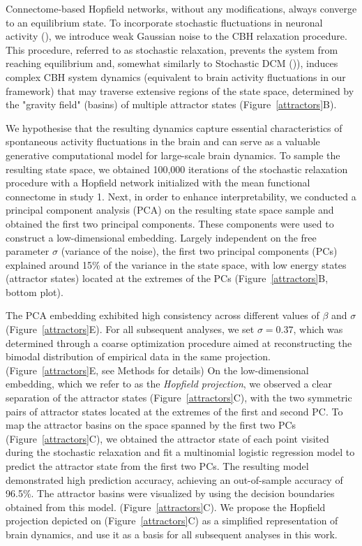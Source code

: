 \documentclass{article}
\begin{document}
Connectome-based Hopfield networks, without any modifications, always converge to an equilibrium state.
To incorporate stochastic fluctuations in neuronal activity (\href{https://doi.org/10.1098/rstb.2005.1638}{}), we introduce weak Gaussian noise to the CBH relaxation procedure. This procedure, referred to as stochastic relaxation, prevents the system from reaching equilibrium and, somewhat similarly to Stochastic DCM (\href{https://doi.org/10.1016/j.neuroimage.2012.04.061}{})), induces complex CBH system dynamics  (equivalent to brain activity fluctuations in our framework) that may traverse extensive regions of the state space, determined by the "gravity field" (basins) of multiple attractor states (Figure~\ref{attractors}B).

We hypothesise that the resulting dynamics capture essential characteristics of spontaneous activity fluctuations in the brain and can serve as a valuable generative computational model for large-scale brain dynamics.
To sample the resulting state space, we obtained 100,000 iterations of the stochastic relaxation procedure with a Hopfield network initialized with the mean functional connectome in study 1.
Next, in order to enhance interpretability, we conducted a principal component analysis (PCA) on the resulting state space sample and obtained the first two principal components. These components were used to construct a low-dimensional embedding.
Largely independent on the free parameter $\sigma$ (variance of the noise), the first two principal components (PCs) explained around 15\% of the variance in the state space, with low energy states (attractor states) located at the extremes of the PCs (Figure~\ref{attractors}B, bottom plot).

The PCA embedding exhibited high consistency across different values of $\beta$ and $\sigma$ (Figure~\ref{attractors}E).
For all subsequent analyses, we set $\sigma=0.37$, which was determined through a coarse optimization procedure aimed at reconstructing the bimodal distribution of empirical data in the same projection. (Figure~\ref{attractors}E, see Methods for details)
On the low-dimensional embedding, which we refer to as the \textit{Hopfield projection}, we observed a clear separation of the attractor states (Figure~\ref{attractors}C), with the two symmetric pairs of attractor states located at the extremes of the first and second PC.
To map the attractor basins on the space spanned by the first two PCs (Figure~\ref{attractors}C), we obtained the attractor state of each point visited during the stochastic relaxation and fit a multinomial logistic regression model to predict the attractor state from the first two PCs.
The resulting model demonstrated high prediction accuracy, achieving an out-of-sample accuracy of 96.5\%.
The attractor basins were visualized by using the decision boundaries obtained from this model. (Figure~\ref{attractors}C).
We propose the Hopfield projection depicted on (Figure~\ref{attractors}C) as a simplified representation of brain dynamics, and use it as a basis for all subsequent analyses in this work.
\end{document}
